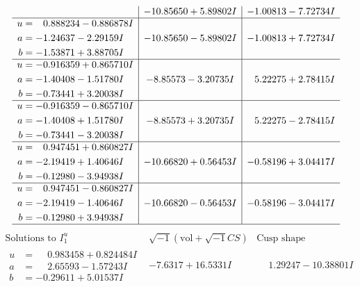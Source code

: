 \documentclass[1p]{elsarticle_modified}
\theoremstyle{definition}
\newcommand{\I}{\sqrt{-1}}
\begin{document}
$$\begin{array}{c|c|c}
 & -10.85650 + 5.89802 I & -1.00813 - 7.72734 I \\ \hline\begin{aligned}
u &= \phantom{-}0.888234 - 0.886878 I \\
a &= -1.24637 - 2.29159 I \\
b &= -1.53871 + 3.88705 I\end{aligned}
 & -10.85650 - 5.89802 I & -1.00813 + 7.72734 I \\ \hline\begin{aligned}
u &= -0.916359 + 0.865710 I \\
a &= -1.40408 - 1.51780 I \\
b &= -0.73441 + 3.20038 I\end{aligned}
 & -8.85573 - 3.20735 I & \phantom{-}5.22275 + 2.78415 I \\ \hline\begin{aligned}
u &= -0.916359 - 0.865710 I \\
a &= -1.40408 + 1.51780 I \\
b &= -0.73441 - 3.20038 I\end{aligned}
 & -8.85573 + 3.20735 I & \phantom{-}5.22275 - 2.78415 I \\ \hline\begin{aligned}
u &= \phantom{-}0.947451 + 0.860827 I \\
a &= -2.19419 + 1.40646 I \\
b &= -0.12980 - 3.94938 I\end{aligned}
 & -10.66820 + 0.56453 I & -0.58196 + 3.04417 I \\ \hline\begin{aligned}
u &= \phantom{-}0.947451 - 0.860827 I \\
a &= -2.19419 - 1.40646 I \\
b &= -0.12980 + 3.94938 I\end{aligned}
 & -10.66820 - 0.56453 I & -0.58196 - 3.04417 I\\
 \hline 
 \end{array}$$\newpage$$\begin{array}{c|c|c}  
\text{Solutions to }I^u_{1}& \I (\text{vol} + \sqrt{-1}CS) & \text{Cusp shape}\\
 \hline 
\begin{aligned}
u &= \phantom{-}0.983458 + 0.824484 I \\
a &= \phantom{-}2.65593 - 1.57243 I \\
b &= -0.29611 + 5.01537 I\end{aligned}
 & -7.6317 + 16.5331 I & \phantom{-}1.29247 - 10.38801 I \\ \hline\begin{aligned}

\end{aligned}
\end{array}$$
\end{document}
